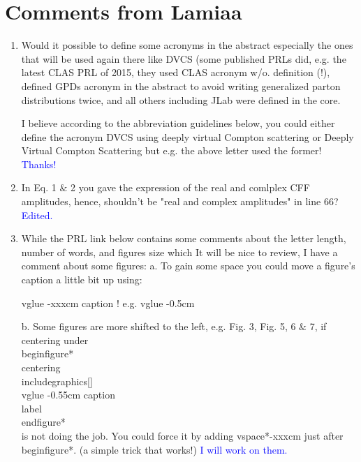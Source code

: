 \documentclass[a4paper,11pt,twoside]{article}
\begin{document}
\section{Comments from Lamiaa}

\begin{enumerate}

\item Would it possible to define some acronyms in the abstract especially the ones that will be used again there like DVCS (some published PRLs did, e.g. the latest CLAS PRL of 2015, they used CLAS acronym w/o. definition (!), defined GPDs acronym in the abstract to avoid writing generalized parton distributions twice, and all others including JLab were defined in the core. 

I believe according to the abbreviation guidelines below, you could either define the acronym DVCS using deeply virtual Compton scattering or Deeply Virtual Compton Scattering but e.g. the above letter used the former!
\textcolor{blue}{Thanks! }
  
\item In Eq. 1 $\&$ 2 you gave the expression of the real and comlplex CFF amplitudes, hence, shouldn't be "real and complex amplitudes" in line 66?
\textcolor{blue}{Edited.}
  
\item While the PRL link below contains some comments about the letter length, number of words, and figures size which It will be nice to review, I have a comment about some figures:
   a. To gain some space you could move a figure's caption a little bit up using:
   

         vglue -xxxcm caption{}               ! e.g. vglue -0.5cm

  
   b. Some figures are more shifted to the left, e.g. Fig. 3, Fig. 5, 6 $\&$ 7, if centering under\\

       begin{figure*}\\
       centering \\
         includegraphics[]{}\\
          vglue -0.55cm caption{}\\
          label\\
         end{figure*}\\

       is not doing the job. You could force it by adding vspace*{-xxxcm} just after begin{figure*}.
       (a simple trick that works!)
\textcolor{blue}{I will work on them. }
  

\end{enumerate}
\end{document}
